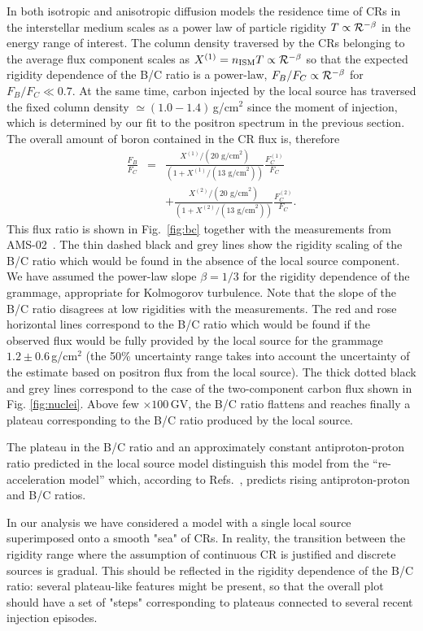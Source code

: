 \documentclass[prd,aps,twocolumn]{revtex4}
\def\R{{\cal R}}
\begin{document}
In both isotropic and anisotropic diffusion models the residence time of CRs 
in the interstellar medium scales as a power law of particle rigidity 
$T\propto \R^{-\beta}$ in the energy range of interest. The column density 
traversed by the CRs belonging to the average flux component scales as 
$X^{(1)}=n_{\rm ISM}T\propto \R^{-\beta}$
so that the expected rigidity dependence of the B/C ratio is a power-law, 
$F_B/F_C\propto \R^{-\beta}$ for $F_B/F_C\ll 0.7$. At the same time, carbon 
injected by the local source has traversed the fixed column density 
$\simeq (1.0-1.4)$\,g/cm$^2$ since the moment of injection, which is
determined by our fit to the positron spectrum in the previous section.
The overall amount of boron contained in the CR flux is, therefore
%
\begin{eqnarray}
\frac{F_B}{F_C}&=&\frac{X^{(1)}/(20\mbox{ g/cm}^2)}{\left(1+X^{(1)}/(13\mbox{ g/cm}^2)\right)}\frac{F^{(1)}_C}{F_C}
\nonumber
\\ && +\frac{X^{(2)}/(20\mbox{ g/cm}^2)}{\left(1+X^{(2)}/(13\mbox{ g/cm}^2)\right)}\frac{F^{(2)}_C}{F_C} .
\end{eqnarray}
%
This flux ratio is shown in Fig.~\ref{fig:bc} together with the measurements 
from AMS-02~\cite{AMS02_BC}.  The thin dashed black and grey lines 
show the rigidity scaling of the B/C ratio which would be found in the 
absence of the local source component. We have assumed the power-law slope 
$\beta=1/3$ for the rigidity dependence of the grammage, appropriate for 
Kolmogorov 
turbulence.  Note that the slope of the B/C ratio  disagrees at low rigidities 
with the measurements. The red and rose  horizontal lines correspond to 
the B/C ratio which would be found if the observed flux would be fully provided
by the local source for the grammage $1.2\pm0.6$\,g/cm$^2$ (the 50\% uncertainty range takes into account the uncertainty of the estimate based on positron flux from the local source). The thick dotted black and grey lines correspond to the case of 
the two-component carbon flux shown in Fig. \ref{fig:nuclei}. Above few 
$\times 100$\,GV, the B/C 
ratio flattens  and reaches finally a plateau corresponding 
to the B/C ratio produced by the local source.

The plateau in the B/C ratio and an approximately constant antiproton-proton
ratio predicted in the local source model distinguish this model
from the ``re-acceleration model'' which, according to
Refs.~\cite{reac,reac2}, predicts rising  antiproton-proton and B/C ratios. 

In our analysis we have considered a model with a single local source 
superimposed onto a smooth "sea" of CRs. In reality, the transition between 
the rigidity range where the assumption of continuous CR is justified
and discrete sources is gradual. This should be reflected in the rigidity 
dependence of the B/C ratio: several plateau-like features might be present, 
so that the overall plot should have a set of "steps" corresponding to 
plateaus connected to several recent injection episodes. 
\end{document}
